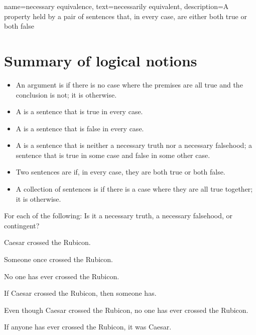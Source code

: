 {
name={necessary equivalence},
text={necessarily equivalent},
description={A property held by a pair of sentences that, in every case, are either both true or both false}
}


\section*{Summary of logical notions}
\begin{highlighted}
\begin{itemize}
\item An argument is  if there is no case where the premises are all true and the conclusion is not; it is  otherwise.

\item A  is a sentence that is true in every case.

\item A  is a sentence that is false in every case.

\item A  is a sentence that is neither a necessary truth nor a necessary falsehood; a sentence that is true in some case and false in some other case.

\item Two sentences are  if, in every case, they are both true or both false.

\item A collection of sentences is  if there is a case where they are all true together; it is  otherwise.
\end{itemize}
\end{highlighted}

\practiceproblems
\problempart
\label{pr.EnglishTautology2}
For each of the following: Is it a necessary truth, a necessary falsehood, or contingent?
\begin{earg}
\item Caesar crossed the Rubicon.
\item Someone once crossed the Rubicon.
\item No one has ever crossed the Rubicon.
\item If Caesar crossed the Rubicon, then someone has.
\item Even though Caesar crossed the Rubicon, no one has ever crossed the Rubicon.
\item If anyone has ever crossed the Rubicon, it was Caesar.
\end{earg}

